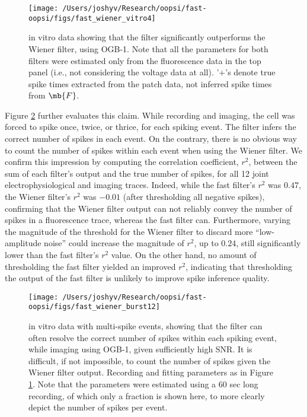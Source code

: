 \begin{figure}[h!]
\centering \texttt{[image: /Users/joshyv/Research/oopsi/fast-oopsi/figs/fast\_wiener\_vitro4]}
\caption[\foopsi filter outperforms Wiener filter on biological data]{in vitro data showing that the \foopsi filter significantly outperforms the Wiener filter, using OGB-1. Note that all the parameters for both filters were estimated only from the fluorescence data in the top panel (i.e., not considering the voltage data at all).  '$+$'s denote true spike times extracted from the patch data, not inferred spike times from $\mb{F}$.} \label{fig:woopsi_data}
\end{figure}


Figure \ref{fig:woopsi_data_doublets} further evaluates this claim.  While recording and imaging, the cell was forced to spike once, twice, or thrice, for each spiking event.  The \foopsi filter infers the correct number of spikes in each event.  On the contrary, there is no obvious way to count the number of spikes within each event when using the Wiener filter. We confirm this impression by computing the correlation coefficient, $r^2$, between the sum of each filter's output and the true number of spikes, for all 12 joint electrophysiological and imaging traces.  Indeed, while the fast filter's $r^2$ was $0.47$, the Wiener filter's $r^2$ was $-0.01$ (after thresholding all negative spikes), confirming that the Wiener filter output can not reliably convey the number of spikes in a fluorescence trace, whereas the fast filter can.  Furthermore, varying the magnitude of the threshold for the Wiener filter to discard more ``low-amplitude noise'' could increase the magnitude of $r^2$, up to $0.24$, still significantly lower than the fast filter's $r^2$ value.  On the other hand, no amount of thresholding the fast filter yielded an improved $r^2$, indicating that thresholding the output of the fast filter is unlikely to improve spike inference quality.

\begin{figure}[h!]
\centering \texttt{[image: /Users/joshyv/Research/oopsi/fast-oopsi/figs/fast\_wiener\_burst12]}
\caption[\foopsi filter outperforms Wiener filter on multi-spike events]{in vitro data with multi-spike events, showing that the \foopsi filter can often resolve the correct number of spikes within each spiking event, while imaging using OGB-1, given sufficiently high SNR.  It is difficult, if not impossible, to count the number of spikes given the Wiener filter output.  Recording and fitting parameters as in Figure \ref{fig:woopsi_data}. Note that the parameters were estimated using a 60 sec long recording, of which only a fraction is shown here, to more clearly depict the number of spikes per event.  } \label{fig:woopsi_data_doublets}
\end{figure}





